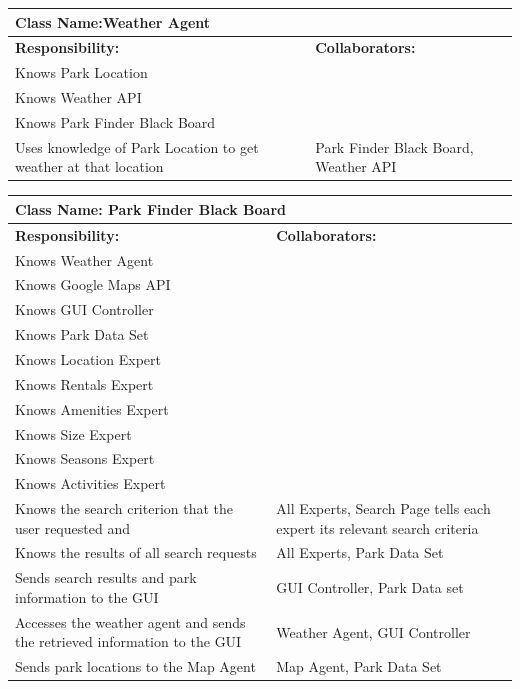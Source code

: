\documentclass[titlepage,12pt]{article}
\begin{document}
 				\begin{table}[H]
 					\centering
 					\begin{tabular}{|p{5cm}|p{5cm}|}
 						\hline 
 						\multicolumn{2}{|l|}{\textbf{Class Name:Weather Agent}} \\
 						\hline
 						\textbf{Responsibility:} & \textbf{Collaborators:} \\
 						\hline
 						Knows Park Location & \\
 						\hline
 						Knows Weather API & \\
 						\hline
 						Knows Park Finder Black Board & \\
 						\hline
 						Uses knowledge of Park Location to get weather at that location  &	Park Finder Black Board, Weather API \\
 						\hline
 					\end{tabular}
 				\end{table}	
 				\begin{table}[H]
 					\centering
 					\begin{tabular}{|p{5cm}|p{5cm}|}
 						\hline 
 						\multicolumn{2}{|l|}{\textbf{Class Name: 						Park Finder Black Board}} \\
 						\hline
 						\textbf{Responsibility:} & \textbf{Collaborators:} \\
 						\hline

 						Knows Weather Agent & \\ \hline
 						Knows Google Maps API & \\ \hline
 						Knows GUI Controller & \\ \hline
 						Knows Park Data Set & \\ \hline
 						Knows Location Expert & \\ \hline
 						Knows Rentals Expert & \\ \hline
 						Knows Amenities Expert & \\ \hline
 						Knows Size Expert & \\ \hline
 						Knows Seasons Expert & \\ \hline
 						Knows Activities Expert  & \\ \hline
 						Knows the search criterion that the user requested and &	All Experts, Search Page
 						tells each expert its relevant search criteria\\ \hline
 						Knows the results of all search requests & 	All Experts, Park Data Set\\ \hline
 						Sends search results and park information to the GUI	& GUI Controller, Park Data set\\ \hline
 						Accesses the weather agent and sends the retrieved information to the GUI	& Weather Agent, GUI Controller\\ \hline
 						Sends park locations to the Map Agent	& Map Agent, Park Data Set\\ \hline
 					\end{tabular}
 				\end{table}		
 			
\end{document}
